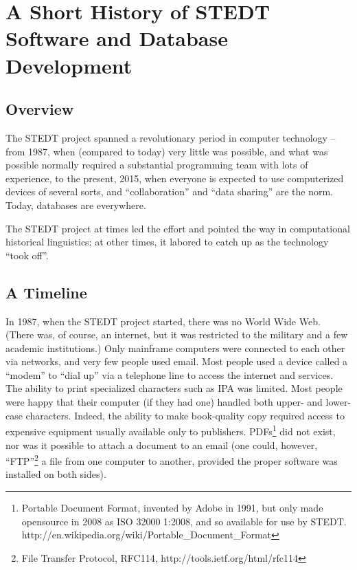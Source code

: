 \vspace{0.25em}

\renewcommand{\thefootnote}{\arabic{footnote}}
\setcounter{footnote}{0}

\chapter*{A Short History of STEDT Software and Database Development}

\section{Overview}

The STEDT project spanned a revolutionary period in computer
technology -- from 1987, when (compared to today) very little was possible, and what was
possible normally required a substantial programming team with lots of
experience, to the present, 2015, when everyone is expected to use
computerized devices of several sorts, and  ``collaboration'' and ``data
sharing'' are the norm. Today, databases are everywhere.

The STEDT project at times led the effort and pointed the way in
computational historical linguistics; at other times, it labored to
catch up as the technology ``took off''.

\section{A Timeline}

In 1987, when the STEDT project started, there was no World Wide Web. (There was, of course, an internet, but it was restricted to
the military and a few academic institutions.) Only mainframe
computers were connected to each other via networks, and very few
people used email.  Most people used a device called a ``modem'' to ``dial up'' via a
telephone line to access the internet and services. The ability to print specialized characters such as IPA was
limited. Most people were happy that their computer (if they had one)
handled both upper- and lower-case characters.  
Indeed, the ability to make book-quality copy required access to
expensive equipment usually available only to
publishers. PDFs\footnote{Portable Document Format, invented by Adobe
in 1991, but only made opensource in 2008 as ISO 32000 1:2008, and  
so available for use by STEDT. http://en.wikipedia.org/wiki/Portable\_Document\_Format} did not exist, 
nor was it possible to attach a document to an email (one
could, however, ``FTP''\footnote{File Transfer Protocol, RFC114, http://tools.ietf.org/html/rfc114} a file 
from one computer to another, provided the proper software was installed on both sides).

